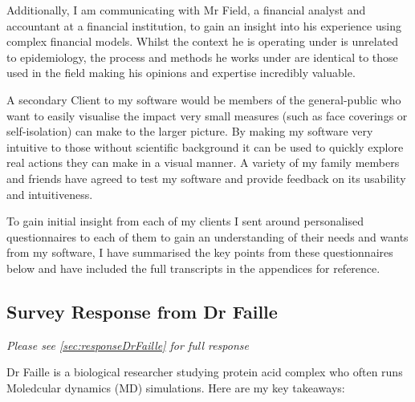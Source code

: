 Additionally, I am communicating with Mr Field, a financial analyst and accountant at a financial institution, to gain an insight into his experience using complex financial models. Whilst the context he is operating under is unrelated to epidemiology, the process and methods he works under are identical to those used in the field making his opinions and expertise incredibly valuable.

A secondary Client to my software would be members of the general-public who want to easily visualise the impact very small measures (such as face coverings or self-isolation) can make to the larger picture. By making my software very intuitive to those without scientific background it can be used to quickly explore real actions they can make in a visual manner. A variety of my family members and friends have agreed to test my software and provide feedback on its usability and intuitiveness.

To gain initial insight from each of my clients I sent around personalised questionnaires to each of them to gain an understanding of their needs and wants from my software, I have summarised the key points from these questionnaires below and have included the full transcripts in the appendices for reference. 
\subsection{Survey Response from Dr Faille}

\textit{Please see \autoref{sec:responseDrFaille} for full response}

Dr Faille is a biological researcher studying protein acid complex who often runs Moledcular dynamics (MD) simulations. Here are my key takeaways:

